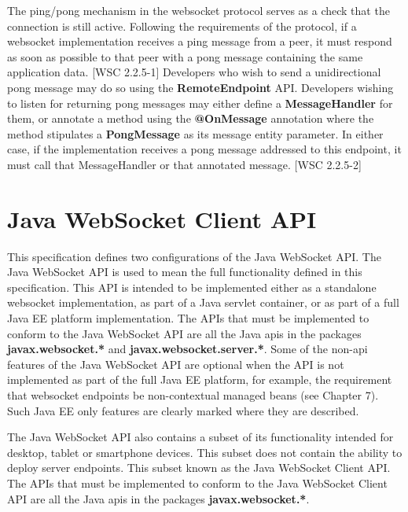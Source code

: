 The ping/pong mechanism in the websocket protocol serves as a check that the connection is still active. Following the requirements of the protocol, if a websocket implementation receives a ping message from a peer, it must respond as soon as possible to that peer with a pong message containing the same application data. [WSC 2.2.5-1] Developers who wish to send a unidirectional pong message may do so using the \textbf{RemoteEndpoint} API. Developers wishing to listen for returning pong messages may either define a \textbf{MessageHandler} for them, or annotate a method using the \textbf{@OnMessage} annotation where the method stipulates a \textbf{PongMessage} as its message entity parameter. In either case, if the implementation receives a pong message addressed to this endpoint, it must call that MessageHandler or that annotated message. [WSC 2.2.5-2]


\section{Java WebSocket Client API}
\label{clientapi}

This specification defines two configurations of the Java WebSocket API. The Java WebSocket API is used to mean the full functionality defined in this specification. This API is intended to be implemented either as a standalone websocket implementation, as part of a Java servlet container, or as part of a full Java EE platform implementation. The APIs that must be implemented to conform to the Java WebSocket API are all the Java apis in the packages \textbf{javax.websocket.*} and \textbf{javax.websocket.server.*}. Some of the non-api features of the Java WebSocket API are optional when the API is not implemented as part of the full Java EE platform, for example, the requirement that websocket endpoints be non-contextual managed beans (see Chapter 7). Such Java EE only features are clearly marked where they are described.

The Java WebSocket API also contains a subset of its functionality intended for desktop, tablet or smartphone devices. This subset does not contain the ability to deploy server endpoints. This subset known as the Java WebSocket Client API. The APIs that must be implemented to conform to the Java WebSocket Client API are all the Java apis in the packages \textbf{javax.websocket.*}.
